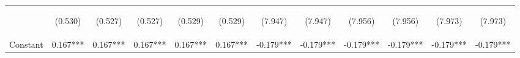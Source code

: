 \documentclass[]{article}
\begin{document}
\begin{center}
\begin{tabular}{lccccccccccc}
        \vspace{4pt}     & \begin{footnotesize}(0.530)\end{footnotesize}  & \begin{footnotesize}(0.527)\end{footnotesize}  & \begin{footnotesize}(0.527)\end{footnotesize}  & \begin{footnotesize}(0.529)\end{footnotesize}  & \begin{footnotesize}(0.529)\end{footnotesize}  & \begin{footnotesize}(7.947)\end{footnotesize}   & \begin{footnotesize}(7.947)\end{footnotesize}   & \begin{footnotesize}(7.956)\end{footnotesize}  & \begin{footnotesize}(7.956)\end{footnotesize}  & \begin{footnotesize}(7.973)\end{footnotesize}  & \begin{footnotesize}(7.973)\end{footnotesize}  \\
        Constant         & 0.167***                                       & 0.167***                                       & 0.167***                                       & 0.167***                                       & 0.167***                                       & -0.179***                                       & -0.179***                                       & -0.179***                                      & -0.179***                                      & -0.179***                                      & -0.179***                                      \\

\end{tabular}
\end{center}
\end{document}
